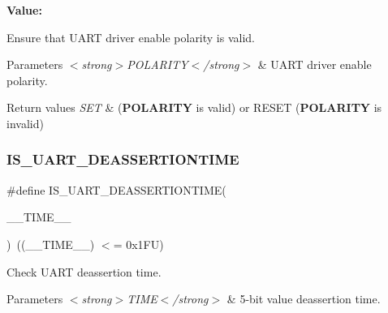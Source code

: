 {\bfseries Value\+:}
\begin{DoxyCode}{0}

\end{DoxyCode}


Ensure that U\+A\+RT driver enable polarity is valid. 


\begin{DoxyParams}{Parameters}
{\em $<$strong$>$\+P\+O\+L\+A\+R\+I\+T\+Y$<$/strong$>$} & U\+A\+RT driver enable polarity. \\
\hline
\end{DoxyParams}

\begin{DoxyRetVals}{Return values}
{\em S\+ET} & ({\bfseries{P\+O\+L\+A\+R\+I\+TY}} is valid) or R\+E\+S\+ET ({\bfseries{P\+O\+L\+A\+R\+I\+TY}} is invalid) \\
\hline
\end{DoxyRetVals}
\mbox{\label{group___u_a_r_t___private___macros_ga7e060b24713e3fb49f4f0f4fa71dd85f}} 
\subsubsection{\texorpdfstring{IS\_UART\_DEASSERTIONTIME}{IS\_UART\_DEASSERTIONTIME}}
{\footnotesize\ttfamily \#define I\+S\+\_\+\+U\+A\+R\+T\+\_\+\+D\+E\+A\+S\+S\+E\+R\+T\+I\+O\+N\+T\+I\+ME(\begin{DoxyParamCaption}\item[{}]{\+\_\+\+\_\+\+T\+I\+M\+E\+\_\+\+\_\+ }\end{DoxyParamCaption})~((\+\_\+\+\_\+\+T\+I\+M\+E\+\_\+\+\_\+) $<$= 0x1\+F\+U)}



Check U\+A\+RT deassertion time. 


\begin{DoxyParams}{Parameters}
{\em $<$strong$>$\+T\+I\+M\+E$<$/strong$>$} & 5-\/bit value deassertion time. \\
\hline
\end{DoxyParams}

